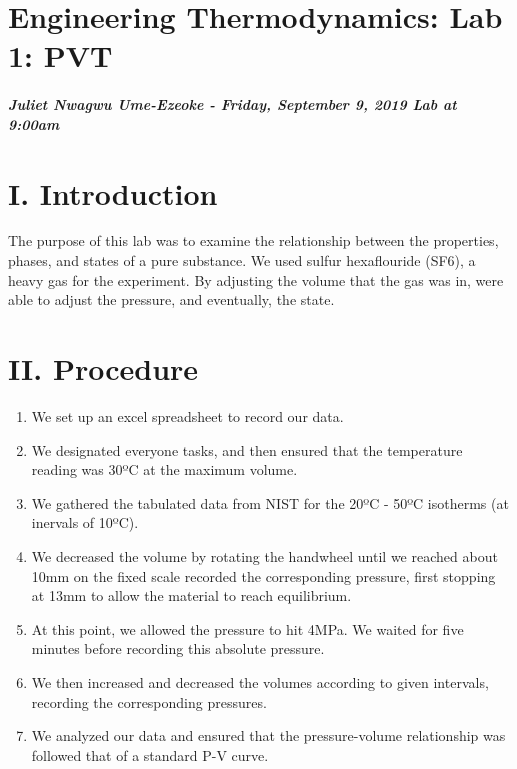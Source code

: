\hypertarget{engineering-thermodynamics-lab-1-pvt}{%
\section{\texorpdfstring{\textbf{\textbf{Engineering Thermodynamics: Lab
1:
PVT}}}{Engineering Thermodynamics: Lab 1: PVT}}\label{engineering-thermodynamics-lab-1-pvt}}

\hypertarget{juliet-nwagwu-ume-ezeoke---friday-september-9-2019-lab-at-900am}{%
\subparagraph{Juliet Nwagwu Ume-Ezeoke - Friday, September 9, 2019 Lab
at
9:00am}\label{juliet-nwagwu-ume-ezeoke---friday-september-9-2019-lab-at-900am}}

\hypertarget{i.-introduction}{%
\section{I. Introduction}\label{i.-introduction}}

The purpose of this lab was to examine the relationship between the
properties, phases, and states of a pure substance. We used sulfur
hexaflouride (SF6), a heavy gas for the experiment. By adjusting the
volume that the gas was in, were able to adjust the pressure, and
eventually, the state.

\hypertarget{ii.-procedure}{%
\section{II. Procedure}\label{ii.-procedure}}

\begin{enumerate}
\def\labelenumi{\arabic{enumi}.}
\tightlist
\item
  We set up an excel spreadsheet to record our data.
\item
  We designated everyone tasks, and then ensured that the temperature
  reading was 30ºC at the maximum volume.
\item
  We gathered the tabulated data from NIST for the 20ºC - 50ºC isotherms
  (at inervals of 10ºC).
\item
  We decreased the volume by rotating the handwheel until we reached
  about 10mm on the fixed scale recorded the corresponding pressure,
  first stopping at 13mm to allow the material to reach equilibrium.
\item
  At this point, we allowed the pressure to hit 4MPa. We waited for five
  minutes before recording this absolute pressure.
\item
  We then increased and decreased the volumes according to given
  intervals, recording the corresponding pressures.
\item
  We analyzed our data and ensured that the pressure-volume relationship
  was followed that of a standard P-V curve.
\end{enumerate}

